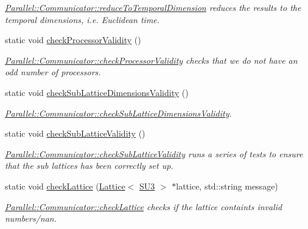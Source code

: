 \begin{DoxyCompactItemize}
\begin{DoxyCompactList}\small\item\em \mbox{\hyperlink{class_parallel_1_1_communicator_a5d42989e7a3022de6042e3503aa35346}{Parallel\+::\+Communicator\+::reduce\+To\+Temporal\+Dimension}} reduces the results to the temporal dimensions, i.\+e. Euclidean time. \end{DoxyCompactList}\item 
static void \mbox{\hyperlink{class_parallel_1_1_communicator_acd7e2f114728e5207093743a58ab3a40}{check\+Processor\+Validity}} ()
\begin{DoxyCompactList}\small\item\em \mbox{\hyperlink{class_parallel_1_1_communicator_acd7e2f114728e5207093743a58ab3a40}{Parallel\+::\+Communicator\+::check\+Processor\+Validity}} checks that we do not have an odd number of processors. \end{DoxyCompactList}\item 
static void \mbox{\hyperlink{class_parallel_1_1_communicator_a535fddf3fe091b82f8ca3de7974f7412}{check\+Sub\+Lattice\+Dimensions\+Validity}} ()
\begin{DoxyCompactList}\small\item\em \mbox{\hyperlink{class_parallel_1_1_communicator_a535fddf3fe091b82f8ca3de7974f7412}{Parallel\+::\+Communicator\+::check\+Sub\+Lattice\+Dimensions\+Validity}}. \end{DoxyCompactList}\item 
static void \mbox{\hyperlink{class_parallel_1_1_communicator_a5da7239eefebcebbeeabee499b2d724d}{check\+Sub\+Lattice\+Validity}} ()
\begin{DoxyCompactList}\small\item\em \mbox{\hyperlink{class_parallel_1_1_communicator_a5da7239eefebcebbeeabee499b2d724d}{Parallel\+::\+Communicator\+::check\+Sub\+Lattice\+Validity}} runs a series of tests to ensure that the sub lattices has been correctly set up. \end{DoxyCompactList}\item 
static void \mbox{\hyperlink{class_parallel_1_1_communicator_a9471bf9448f34a0b4575310a3c54af61}{check\+Lattice}} (\mbox{\hyperlink{class_lattice}{Lattice}}$<$ \mbox{\hyperlink{class_s_u3}{S\+U3}} $>$ $\ast$lattice, std\+::string message)
\begin{DoxyCompactList}\small\item\em \mbox{\hyperlink{class_parallel_1_1_communicator_a9471bf9448f34a0b4575310a3c54af61}{Parallel\+::\+Communicator\+::check\+Lattice}} checks if the lattice containts invalid numbers/nan. \end{DoxyCompactList}\end{DoxyCompactItemize}


